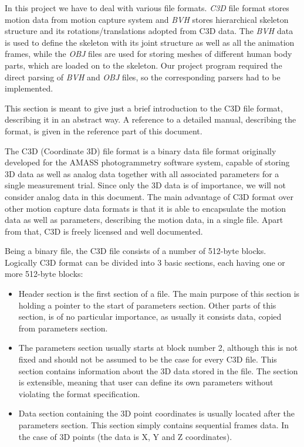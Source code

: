 \documentclass[times, 10pt,twocolumn]{article}
\begin{document}
\label{data_formats}
In this project we have to deal with various file formats. \emph{C3D} file format stores motion data from motion capture system and \emph{BVH} stores hierarchical skeleton structure and its rotations/translations adopted from C3D data. The \emph{BVH} data is used to define the skeleton with its joint structure as well as all the animation frames, while the \emph{OBJ} files are used for storing meshes of different human body parts, which are loaded on to the skeleton. Our project program required the direct parsing of \emph{BVH} and \emph{OBJ} files, so the corresponding parsers had to be implemented.


This section is meant to give just a brief introduction to the C3D file format, describing it in an abstract way. A reference to a detailed manual, describing the format, is given in the reference part of this document.

The C3D (Coordinate 3D) file format is a binary data file format originally developed for the AMASS photogrammetry software system, capable of storing 3D data as well as analog data together with all associated parameters for a single measurement trial. Since only the 3D data is of importance, we will not consider analog data in this document. The main advantage of C3D format over other motion capture data formats is that it is able to encapsulate the motion data as well as parameters, describing the  motion data, in a single file. Apart from that, C3D is freely licensed and well documented.

Being a binary file, the C3D file consists of a number of 512-byte blocks. Logically C3D format can be divided into 3 basic sections, each having one or more 512-byte blocks:
\begin{itemize}
\item Header section is the first section of a file. The main purpose of this section is holding a pointer to the start of parameters section. Other parts of this section, is of no particular importance, as usually it consists data, copied from parameters section.

\item The parameters section usually starts at block number 2, although this is not fixed and should not be assumed to be the case for every C3D file. This section contains information about the 3D data stored in the file. The section is extensible, meaning that user can define its own parameters without  violating the format specification.

\item Data section containing the 3D point coordinates is usually located after the parameters section. This section simply contains sequential frames data. In the case of 3D points (the data is X, Y and Z coordinates).
\end{itemize}
\end{document}
